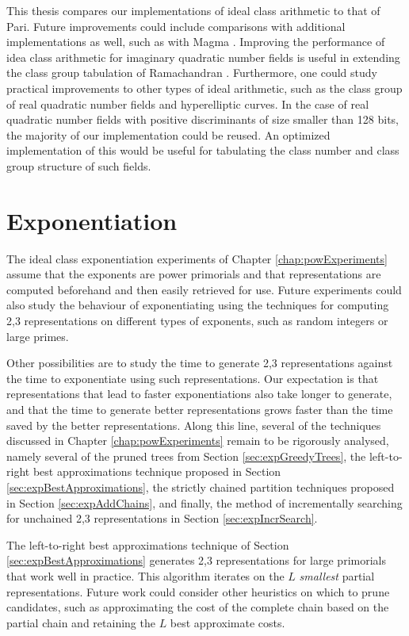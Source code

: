 \documentclass{ucalgthes1}
\theoremstyle{definition}
\begin{document}
This thesis compares our implementations of ideal class arithmetic to that of Pari.  Future improvements could include comparisons with additional implementations as well, such as with Magma \cite{Magma}.  Improving the performance of idea class arithmetic for imaginary quadratic number fields is useful in extending the class group tabulation of Ramachandran \cite{Ramachandran2006}.  Furthermore, one could study practical improvements to other types of ideal arithmetic, such as the class group of real quadratic number fields and hyperelliptic curves.  In the case of real quadratic number fields with positive discriminants of size smaller than 128 bits, the majority of our implementation could be reused.  An optimized implementation of this would be useful for tabulating the class number and class group structure of such fields.

\section{Exponentiation}
\label{sec:futureExponentiation}

The ideal class exponentiation experiments of Chapter \ref{chap:powExperiments} assume that the exponents are power primorials and that representations are computed beforehand and then easily retrieved for use.  Future experiments could also study the behaviour of exponentiating using the techniques for computing 2,3 representations on different types of exponents, such as random integers or large primes.

Other possibilities are to study the time to generate 2,3 representations against the time to exponentiate using such representations.  Our expectation is that representations that lead to faster exponentiations also take longer to generate, and that the time to generate better representations grows faster than the time saved by the better representations.  Along this line, several of the techniques discussed in Chapter \ref{chap:powExperiments} remain to be rigorously analysed, namely several of the pruned trees from Section \ref{sec:expGreedyTrees}, the left-to-right best approximations technique proposed in Section \ref{sec:expBestApproximations}, the strictly chained partition techniques proposed in Section \ref{sec:expAddChains}, and finally, the method of incrementally searching for unchained 2,3 representations in Section \ref{sec:expIncrSearch}.

The left-to-right best approximations technique of Section \ref{sec:expBestApproximations} generates 2,3 representations for large primorials that work well in practice.  This algorithm iterates on the $L$ \emph{smallest} partial representations.  Future work could consider other heuristics on which to prune candidates, such as approximating the cost of the complete chain based on the partial chain and retaining the $L$ best approximate costs.
\end{document}
